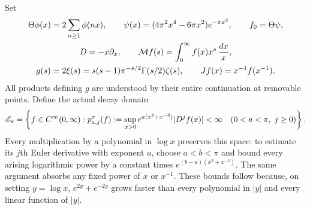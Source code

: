 Set
\begin{equation}\label{hdt:eq:objects}
\begin{gathered}
\Theta\phi(x)=2\sum_{n\geq1}\phi(nx),\qquad
\psi(x)=(4\pi^2x^4-6\pi x^2)e^{-\pi x^2},\qquad f_0=\Theta\psi,\\
D=-x\partial_x,\qquad
\mathcal M f(s)=\int_0^\infty f(x)x^s\,\frac{dx}{x},\\
g(s)=2\xi(s)=s(s-1)\pi^{-s/2}\Gamma(s/2)\zeta(s),\qquad
Jf(x)=x^{-1}f(x^{-1}).
\end{gathered}
\end{equation}
All products defining $g$ are understood by their entire continuation
at removable points. Define the actual decay domain
\begin{equation}\label{hdt:eq:Epi}
\mathscr E_\pi=\left\{f\in C^\infty(0,\infty):
p_{a,j}^{\pi}(f):=\sup_{x>0}e^{a(x^2+x^{-2})}|D^jf(x)|<\infty
\quad(0<a<\pi,\ j\geq0)\right\}.
\end{equation}
Every multiplication by a polynomial in $\log x$ preserves this
space: to estimate its $j$th Euler derivative with exponent $a$, choose
$a<b<\pi$ and bound every arising logarithmic power by a constant
times $e^{(b-a)(x^2+x^{-2})}$. The same argument absorbs any fixed
power of $x$ or $x^{-1}$. These bounds follow because, on setting
$y=\log x$, $e^{2y}+e^{-2y}$ grows faster than every polynomial in
$|y|$ and every linear function of $|y|$.

